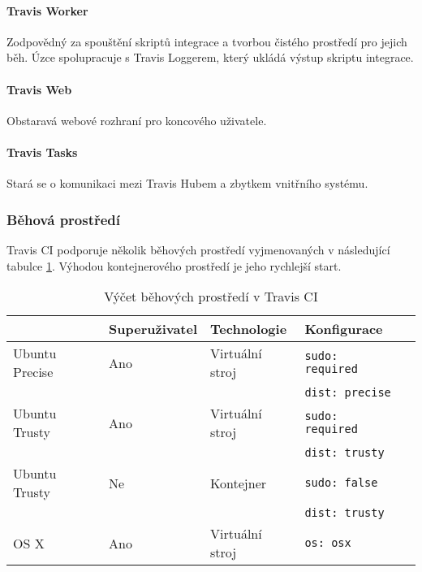 \paragraph{Travis Worker}

Zodpovědný za spouštění skriptů integrace a tvorbou čistého prostředí pro jejich běh.
Úzce spolupracuje s Travis Loggerem, který ukládá výstup skriptu integrace.

\paragraph{Travis Web}

Obstaravá webové rozhraní pro koncového uživatele.

\paragraph{Travis Tasks}

Stará se o komunikaci mezi Travis Hubem a zbytkem vnitřního systému.

\subsubsection{Běhová prostředí}

Travis CI podporuje několik běhových prostředí vyjmenovaných v následující tabulce \ref{table:travis-env}.
Výhodou kontejnerového prostředí je jeho rychlejší start.

\begin{table}[ht]
\centering
\caption{Výčet běhových prostředí v Travis CI}
\label{table:travis-env}
\begin{tabular}{|l|l|l|l|l|}
\hline
& Superuživatel & Technologie & Konfigurace  \\ \hline
Ubuntu Precise & Ano & Virtuální stroj & \verb|sudo: required| \\ 
& & & \verb|dist: precise|  \\ \hline
Ubuntu Trusty & Ano & Virtuální stroj & \verb|sudo: required| \\
& & & \verb|dist: trusty| \\ \hline
Ubuntu Trusty & Ne & Kontejner & \verb|sudo: false|  \\
& & & \verb|dist: trusty| \\ \hline
OS X & Ano & Virtuální stroj & \verb|os: osx|  \\ \hline
\end{tabular}
\end{table}

